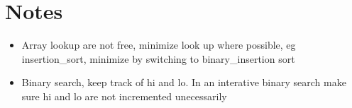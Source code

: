 \documentclass{article}
\begin{document}
\renewcommand{\Re}{\ensuremath{\mathbb{R}}}
\newcommand{\norm}[1]{\ensuremath{\Vert#1\Vert}}
\newcommand{\abs}[1]{\ensuremath{\vert#1\vert}}
\newcommand{\rsSum}{\ensuremath{S(\pi,f,\alpha) }}
\newcommand{\ltwo}[1][]{\ensuremath{L^2#1}}
\newcommand{\para}{
   \vspace{.4cm}
   \ifthenelse { \value{OldSection} < \value{section} }
      { \setcounter{OldSection}{ \value{section} }
        \setcounter{ParCount}{ 0 } }
      {}
   \stepcounter{ParCount}
   \noindent
   \bf \arabic{section}.\arabic{ParCount}. \rm \hspace{.2cm}
 }

\section{Notes}

\begin{itemize}
\item Array lookup are not free, minimize look up where possible, eg insertion_sort, minimize by switching to binary_insertion sort
\item Binary search, keep track of hi and lo. In an interative binary search make sure hi and lo are not incremented unecessarily
\end{itemize}
\end{document}
